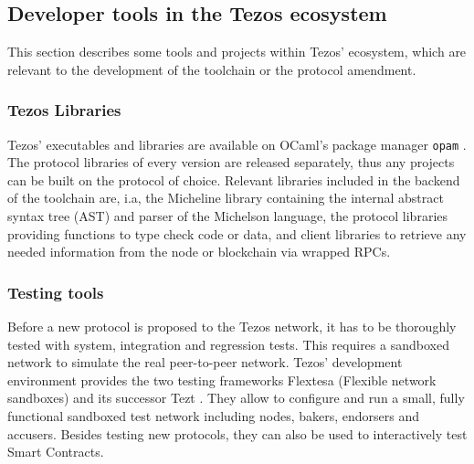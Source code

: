\subsection{Developer tools in the Tezos ecosystem}
This section describes some tools and projects within Tezos' ecosystem, which are relevant to the development of the toolchain or the protocol amendment.

\subsubsection{Tezos Libraries}
Tezos' executables and libraries are available on OCaml's package manager \texttt{opam} \cite{tezos_opam}. The protocol libraries of every version are released separately, thus any projects can be built on the protocol of choice. Relevant libraries included in the backend of the toolchain are, i.a, the Micheline library containing the internal abstract syntax tree (AST) and parser of the Michelson language, the protocol libraries providing functions to type check code or data, and client libraries to retrieve any needed information from the node or blockchain via wrapped RPCs.

\subsubsection{Testing tools}
Before a new protocol is proposed to the Tezos network, it has to be thoroughly tested with system, integration and regression tests. This requires a sandboxed network to simulate the real peer-to-peer network. Tezos' development environment provides the two testing frameworks Flextesa (Flexible network sandboxes)\cite{tezos_docs} and its successor Tezt \cite{tezos_docs}. They allow to configure and run a small, fully functional sandboxed test network including nodes, bakers, endorsers and accusers. Besides testing new protocols, they can also be used to interactively test Smart Contracts.

